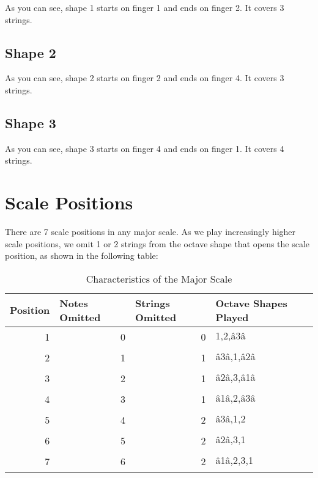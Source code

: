 \documentclass[12pt]{report}
\begin{document}
As you can see, shape 1 starts on finger 1 and ends on finger 2. It
covers 3 strings.

\subsection{Shape 2}
\begin{sideways}
  \def\numfrets{10}


\end{sideways}

As you can see, shape 2 starts on finger 2 and ends on finger 4. It
covers 3 strings.

\subsection{Shape 3}
\begin{sideways}

  \def\numfrets{16}

\end{sideways}

As you can see, shape 3 starts on finger 4 and ends on finger 1. It
covers 4 strings. 

\section{Scale Positions}

There are 7 scale positions in any major scale. As we play increasingly
higher scale positions, we omit 1 or 2 strings from the octave shape
that opens the scale position, as shown in the following table:


\begin{table}[htbp]
\caption{Characteristics of the Major Scale}
\begin{tabular}{|r|r|r|l|}
\hline
\multicolumn{1}{|l|}{Position} & \multicolumn{1}{l|}{Notes Omitted} & \multicolumn{1}{l|}{Strings Omitted} & Octave Shapes Played \\ \hline
1 & 0 & 0 & 1,2,â3â \\ \hline
2 & 1 & 1 & â3â,1,â2â \\ \hline
3 & 2 & 1 & â2â,3,â1â \\ \hline
4 & 3 & 1 & â1â,2,â3â \\ \hline
5 & 4 & 2 & â3â,1,2 \\ \hline
6 & 5 & 2 & â2â,3,1 \\ \hline
7 & 6 & 2 & â1â,2,3,1 \\ \hline
\end{tabular}
\label{}
\end{table}
\end{document}

